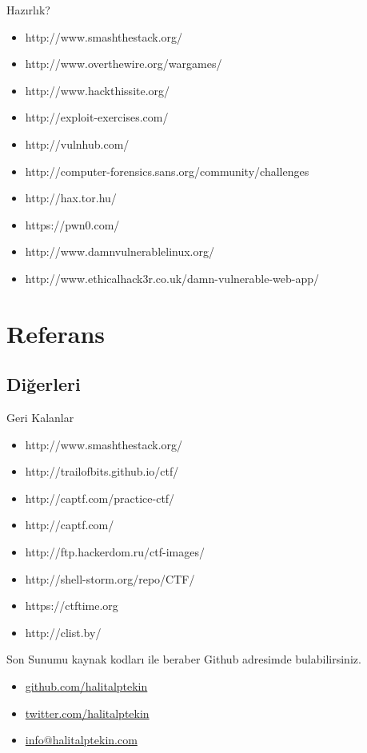 \documentclass[compress]{beamer}
\begin{document}
\begin{frame}{Hazırlık?}

\begin{itemize}
	\item http://www.smashthestack.org/
    \item http://www.overthewire.org/wargames/
    \item http://www.hackthissite.org/
    \item http://exploit-exercises.com/
    \item http://vulnhub.com/
    \item http://computer-forensics.sans.org/community/challenges
    \item http://hax.tor.hu/
    \item https://pwn0.com/
    \item http://www.damnvulnerablelinux.org/
    \item http://www.ethicalhack3r.co.uk/damn-vulnerable-web-app/
    \end{itemize}
\end{frame}

\section{Referans}

\subsection{Diğerleri}

\begin{frame}{Geri Kalanlar}

\begin{itemize}
	\item http://www.smashthestack.org/
	\item http://trailofbits.github.io/ctf/
	\item http://captf.com/practice-ctf/
	\item http://captf.com/
	\item http://ftp.hackerdom.ru/ctf-images/
	\item http://shell-storm.org/repo/CTF/
	\item https://ctftime.org
	\item http://clist.by/
    \end{itemize}
\end{frame}

\begin{frame}{Son}
	Sunumu kaynak kodları ile beraber Github adresimde bulabilirsiniz.
	\begin{itemize}
    	\item \url{github.com/halitalptekin}
        \item \url{twitter.com/halitalptekin}
		\item \url{info@halitalptekin.com}
	\end{itemize}
\end{frame}
\end{document}
